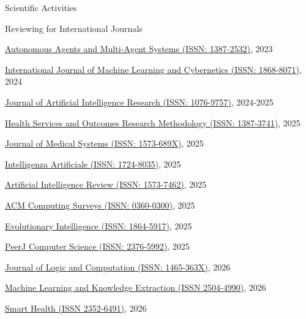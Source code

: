 \documentclass{resume} %
\begin{document}
\begin{rSection}{Scientific Activities}
        \begin{rSubsection2}{Reviewing for International Journals}
            \item \href{https://link.springer.com/journal/10458}{Autonomous Agents and Multi-Agent Systems (ISSN: 1387-2532)}, 2023
            \item \href{https://link.springer.com/journal/13042}{International Journal of Machine Learning and Cybernetics (ISSN: 1868-8071)}, 2024
            \item \href{https://www.jair.org/index.php/jair/index}{Journal of Artificial Intelligence Research (ISSN: 1076-9757)}, 2024-2025
            \item \href{https://link.springer.com/journal/10742}{Health Services and Outcomes Research Methodology (ISSN: 1387-3741)}, 2025
            \item \href{https://link.springer.com/journal/10916}{Journal of Medical Systems (ISSN: 1573-689X)}, 2025
            \item \href{https://journals.sagepub.com/home/INA}{Intelligenza Artificiale (ISSN: 1724-8035)}, 2025
            \item \href{https://link.springer.com/journal/10462}{Artificial Intelligence Review (ISSN: 1573-7462)}, 2025
            \item \href{https://dl.acm.org/journal/csur}{ACM Computing Surveys (ISSN: 0360-0300)}, 2025
            \item \href{https://link.springer.com/journal/12065}{Evolutionary Intelligence (ISSN: 1864-5917)}, 2025
            \item \href{https://peerj.com/computer-science/}{PeerJ Computer Science (ISSN: 2376-5992)}, 2025
            \item \href{https://academic.oup.com/logcom}{Journal of Logic and Computation (ISSN: 1465-363X)}, 2026
            \item \href{https://www.mdpi.com/journal/make}{Machine Learning and Knowledge Extraction (ISSN 2504-4990)}, 2026
            \item \href{https://www.sciencedirect.com/journal/smart-health}{Smart Health (ISSN 2352-6491)}, 2026
        \end{rSubsection2}



\end{rSection}
\end{document}
